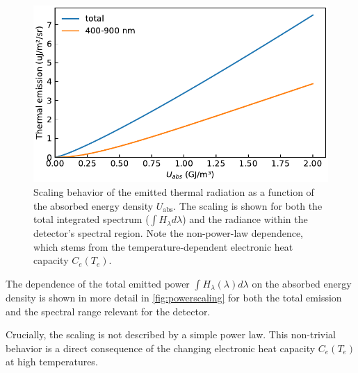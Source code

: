\documentclass[
	a4paper,
]{scrarticle}
\begin{document}
\begin{figure}
    \centering
    \includegraphics{../analysis/figures/powerscaling.pdf}
    \caption{Scaling behavior of the emitted thermal radiation as a function of the absorbed energy density $U_{\text{abs}}$. The scaling is shown for both the total integrated spectrum ($\int H_\lambda d\lambda$) and the radiance within the detector's spectral region. Note the non-power-law dependence, which stems from the temperature-dependent electronic heat capacity $C_e(T_e)$.}
    \label{fig:powerscaling}
\end{figure}
The dependence of the total emitted power $\int H_\lambda(\lambda) d\lambda$ on the absorbed energy density is shown in more detail in \autoref{fig:powerscaling} for both the total emission and the spectral range relevant for the detector.

Crucially, the scaling is not described by a simple power law. This non-trivial behavior is a direct consequence of the changing electronic heat capacity $C_e(T_e)$ at high temperatures.

\clearpage
\end{document}
